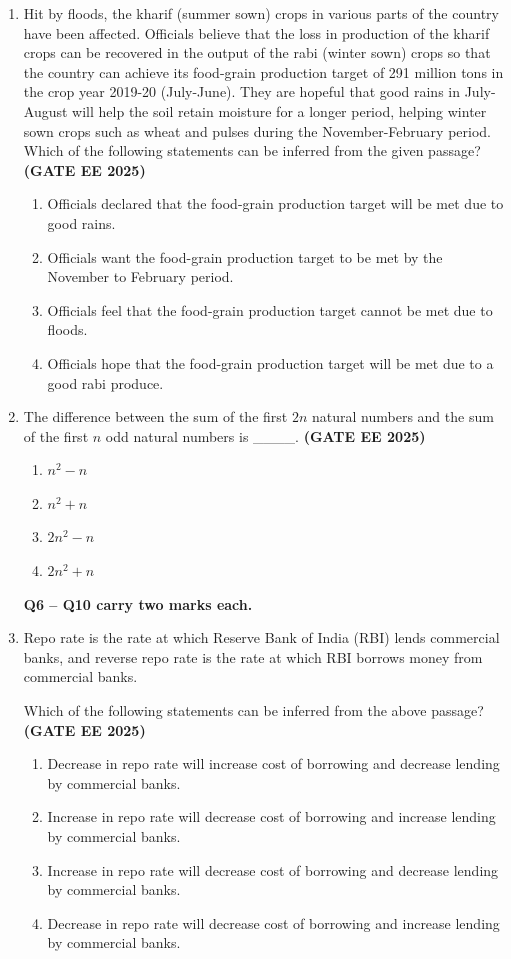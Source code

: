 \documentclass[journal,12pt,onecolumn]{IEEEtran}
\theoremstyle{remark}
\begin{document}
\begin{enumerate}
\item Hit by floods, the kharif (summer sown) crops in various parts of the country have been affected. Officials believe that the loss in production of the kharif crops can be recovered in the output of the rabi (winter sown) crops so that the country can achieve its food-grain production target of 291 million tons in the crop year 2019-20 (July-June). They are hopeful that good rains in July-August will help the soil retain moisture for a longer period, helping winter sown crops such as wheat and pulses during the November-February period. 
Which of the following statements can be inferred from the given passage?
\hfill \textbf{(GATE EE 2025)}
\begin{enumerate}
\item Officials declared that the food-grain production target will be met due to good rains. 
\item Officials want the food-grain production target to be met by the November to February period. 
\item Officials feel that the food-grain production target cannot be met due to floods. 
\item Officials hope that the food-grain production target will be met due to a good rabi produce.
\end{enumerate}


\item The difference between the sum of the first $2n$ natural numbers and the sum of the first $n$ odd natural numbers is \_\_\_\_. \hfill \textbf{(GATE EE 2025)}

\begin{enumerate}
\item $n^2 - n$ 
\item $n^2 + n$ 
\item $2n^2 - n$ 
\item $2n^2 + n$
\end{enumerate}


\textbf{Q6 -- Q10 carry two marks each.}

\item Repo rate is the rate at which Reserve Bank of India (RBI) lends commercial banks, and reverse repo rate is the rate at which RBI borrows money from commercial banks. 

Which of the following statements can be inferred from the above passage? \\ \hfill \textbf{(GATE EE 2025)}
\begin{enumerate}
\item Decrease in repo rate will increase cost of borrowing and decrease lending by commercial banks.
\item Increase in repo rate will decrease cost of borrowing and increase lending by commercial banks.
\item Increase in repo rate will decrease cost of borrowing and decrease lending by commercial banks.
\item Decrease in repo rate will decrease cost of borrowing and increase lending by commercial banks.
\end{enumerate}



\end{enumerate}
\end{document}
